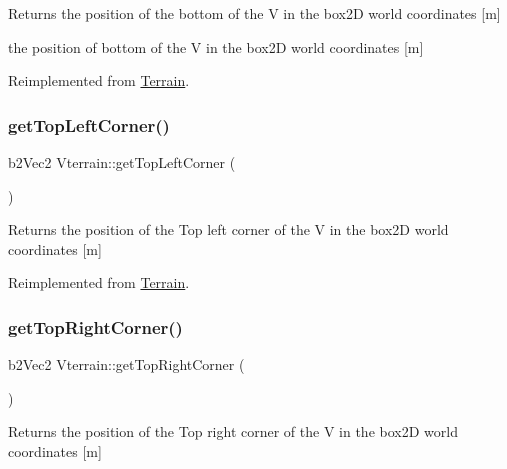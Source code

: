 \begin{DoxyReturn}{Returns}
the position of the bottom of the V in the box2D world coordinates \mbox{[}m\mbox{]}

the position of bottom of the V in the box2D world coordinates \mbox{[}m\mbox{]} 
\end{DoxyReturn}


Reimplemented from \mbox{\hyperlink{class_terrain_a26e1c7c05b8256015730df34d97d29c2}{Terrain}}.

\mbox{\label{class_vterrain_a2a6ee2632c67ebe63871e7954bb199b1}} 
\subsubsection{\texorpdfstring{get\+Top\+Left\+Corner()}{getTopLeftCorner()}}
{\footnotesize\ttfamily b2\+Vec2 Vterrain\+::get\+Top\+Left\+Corner (\begin{DoxyParamCaption}{ }\end{DoxyParamCaption})\hspace{0.3cm}{\ttfamily [virtual]}}

\begin{DoxyReturn}{Returns}
the position of the Top left corner of the V in the box2D world coordinates \mbox{[}m\mbox{]} 
\end{DoxyReturn}


Reimplemented from \mbox{\hyperlink{class_terrain_a8a8629396e5cb03961649acdc23eacf2}{Terrain}}.

\mbox{\label{class_vterrain_a27258a597b11a9cb78bd7e537fb037c4}} 
\subsubsection{\texorpdfstring{get\+Top\+Right\+Corner()}{getTopRightCorner()}}
{\footnotesize\ttfamily b2\+Vec2 Vterrain\+::get\+Top\+Right\+Corner (\begin{DoxyParamCaption}{ }\end{DoxyParamCaption})\hspace{0.3cm}{\ttfamily [virtual]}}

\begin{DoxyReturn}{Returns}
the position of the Top right corner of the V in the box2D world coordinates \mbox{[}m\mbox{]} 
\end{DoxyReturn}


